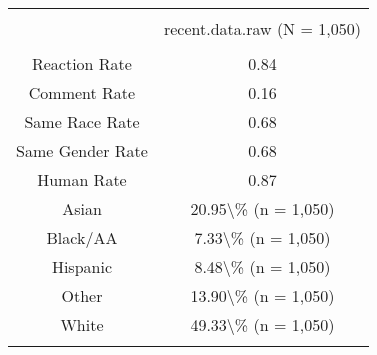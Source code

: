 
\begin{table}[!htbp] \centering 
  \caption{} 
  \label{} 
\begin{tabular}{@{\extracolsep{5pt}} cc} 
\\[-1.8ex]\hline 
\hline \\[-1.8ex] 
 & recent.data.raw (N = 1,050) \\ 
\hline \\[-1.8ex] 
Reaction Rate & 0.84 \\ 
Comment Rate & 0.16 \\ 
Same Race Rate & 0.68 \\ 
Same Gender Rate & 0.68 \\ 
Human Rate & 0.87 \\ 
Asian & 20.95\textbackslash \% (n = 1,050) \\ 
Black/AA & 7.33\textbackslash \% (n = 1,050) \\ 
Hispanic & 8.48\textbackslash \% (n = 1,050) \\ 
Other & 13.90\textbackslash \% (n = 1,050) \\ 
White & 49.33\textbackslash \% (n = 1,050) \\ 
\hline \\[-1.8ex] 
\end{tabular} 
\end{table} 
